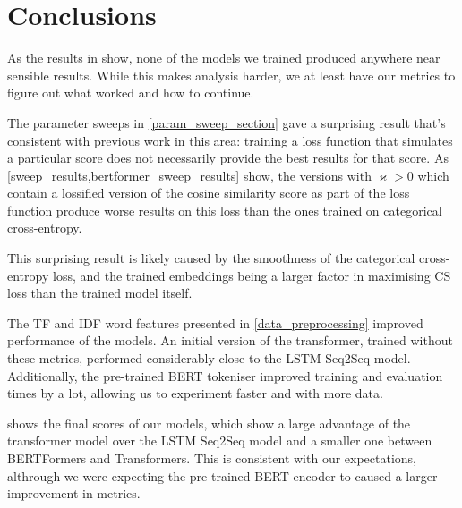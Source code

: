 \section{Conclusions}

As the results in \appendixA{} show, none of the models we trained produced anywhere near sensible results.
While this makes analysis harder, we at least have our metrics to figure out what worked and how to continue.

The parameter sweeps in \cref{param_sweep_section} gave a surprising result that's consistent with previous work in this area: training a loss function that simulates a particular score does not necessarily provide the best results for that score.
As \cref{sweep_results,bertformer_sweep_results} show, the versions with $\varkappa > 0$ which contain a lossified version of the cosine similarity score as part of the loss function produce worse results on this loss than the ones trained on categorical cross-entropy.

This surprising result is likely caused by the smoothness of the categorical cross-entropy loss, and the trained embeddings being a larger factor in maximising CS loss than the trained model itself.

The TF and IDF word features presented in \cref{data_preprocessing} improved performance of the models.
An initial version of the transformer, trained without these metrics, performed considerably close to the LSTM Seq2Seq model.
Additionally, the pre-trained BERT tokeniser improved training and evaluation times by a lot, allowing us to experiment faster and with more data.

 shows the final scores of our models, which show a large advantage of the transformer model over the LSTM Seq2Seq model and a smaller one between BERTFormers and Transformers.
This is consistent with our expectations, althrough we were expecting the pre-trained BERT encoder to caused a larger improvement in metrics.
